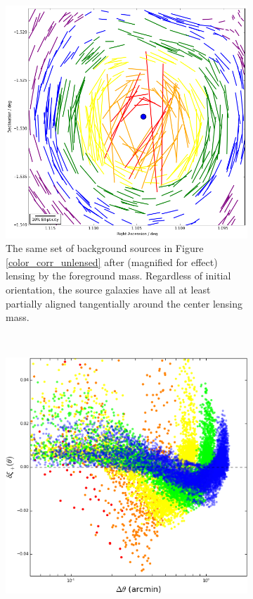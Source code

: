 \documentclass[%
 reprint,
 amsmath,amssymb,
 aps,nofootinbib
]{revtex4-1}
\begin{document}
\begin{figure}[b!]
    \begin{subfigure}{0.45\textwidth}
        \includegraphics[width=\textwidth]{figs-swe/corr_visualization_lensed.png}
        \captionsetup{justification=raggedright,singlelinecheck=false}
        \caption{The same set of background sources in Figure \ref{color_corr_unlensed} after (magnified for effect) lensing by the foreground mass. Regardless of initial orientation, the source galaxies have all at least partially aligned tangentially around the center lensing mass.}
        \label{color_corr_lensed}
    \end{subfigure}
    ~
    \begin{subfigure}{0.45\textwidth}
        \includegraphics[width=\textwidth]{figs-swe/corr_dist_lensed.png}

\end{subfigure}
\end{figure}
\end{document}
